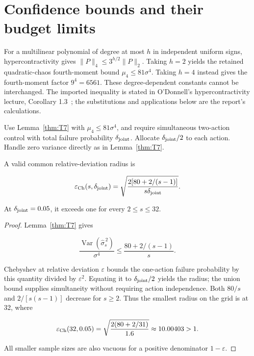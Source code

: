 \section{Confidence bounds and their budget limits}\label{sec:confidence}
For a multilinear polynomial of degree at most $h$ in independent uniform signs, hypercontractivity gives $\|P\|_4\le3^{h/2}\|P\|_2$. Taking $h=2$ yields the retained quadratic-chaos fourth-moment bound $\mu_4\le81\sigma^4$. Taking $h=4$ instead gives the fourth-moment factor $9^4=6561$. These degree-dependent constants cannot be interchanged. The imported inequality is stated in O'Donnell's hypercontractivity lecture, Corollary 1.3~\cite{odonnell2007}; the substitutions and applications below are the report's calculations.

\begin{proposition}\label{thm:T11}
Use Lemma~\ref{thm:T7} with $\mu_4\le81\sigma^4$, and require simultaneous two-action control with total failure probability $\delta_{\rm joint}$. Allocate $\delta_{\rm joint}/2$ to each action. Handle zero variance directly as in Lemma~\ref{thm:T7}.


A valid common relative-deviation radius is


\begin{equation}
\varepsilon_{\rm Ch}(s,\delta_{\rm joint})
=\sqrt{\frac{2[80+2/(s-1)]}{s\delta_{\rm joint}}}.
\end{equation}


At $\delta_{\rm joint}=0.05$, it exceeds one for every $2\le s\le32$.


\end{proposition}
\begin{proof}
Lemma~\ref{thm:T7} gives


\begin{equation}
\frac{\operatorname{Var}(\widehat\sigma_s^{\,2})}{\sigma^4}
\le\frac{80+2/(s-1)}s.
\end{equation}


Chebyshev at relative deviation $\varepsilon$ bounds the one-action failure probability by this quantity divided by $\varepsilon^2$. Equating it to $\delta_{\rm joint}/2$ yields the radius; the union bound supplies simultaneity without requiring action independence. Both $80/s$ and $2/[s(s-1)]$ decrease for $s\ge2$. Thus the smallest radius on the grid is at 32, where


\begin{equation}
\varepsilon_{\rm Ch}(32,0.05)
=\sqrt{\frac{2(80+2/31)}{1.6}}\approx10.00403>1.
\end{equation}


All smaller sample sizes are also vacuous for a positive denominator $1-\varepsilon$.

\end{proof}


